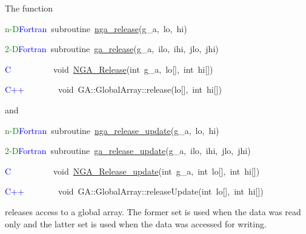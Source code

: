 The function
\begin{lyxcode}
\textcolor{green}{n-D}\textcolor{blue}{Fortran}~subroutine~\href{http://www.emsl.pnl.gov/docs/global/ga_ops.html\#ga_release}{nga\_{}release}(g\_a,~lo,~hi)~

\textcolor{green}{2-D}\textcolor{blue}{Fortran~}subroutine~\href{http://www.emsl.pnl.gov/docs/global/ga_ops.html\#ga_release}{ga\_{}release}(g\_a,~ilo,~ihi,~jlo,~jhi)~

\textcolor{blue}{C}~~~~~~~~~~void~\href{http://www.emsl.pnl.gov/docs/global/c_nga_ops.html\#ga_release}{NGA\_{}Release}(int~g\_a,~lo{[}{]},~int~hi{[}{]})

\textcolor{blue}{C++~}~~~~~~~void~GA::GlobalArray::release(lo{[}{]},~int~hi{[}{]})
\end{lyxcode}
and
\begin{lyxcode}
\textcolor{green}{n-D}\textcolor{blue}{Fortran}~subroutine~\href{http://www.emsl.pnl.gov/docs/global/ga_ops.html\#ga_release_update}{nga\_{}release\_{}update}(g\_a,~lo,~hi)~

\textcolor{green}{2-D}\textcolor{blue}{Fortran}~subroutine~\href{http://www.emsl.pnl.gov/docs/global/ga_ops.html\#ga_release_update}{ga\_{}release\_{}update}(g\_a,~ilo,~ihi,~jlo,~jhi)

\textcolor{blue}{C}~~~~~~~~~~void~\href{http://www.emsl.pnl.gov/docs/global/c_nga_ops.html\#ga_release_update}{NGA\_{}Release\_{}update}(int~g\_a,~int~lo{[}{]},~int~hi{[}{]})~

\textcolor{blue}{C++~}~~~~~~~void~GA::GlobalArray::releaseUpdate(int~lo{[}{]},~int~hi{[}{]})
\end{lyxcode}
releases access to a global array. The former set is used when the
data was read only and the latter set is used when the data was accessed
for writing.

